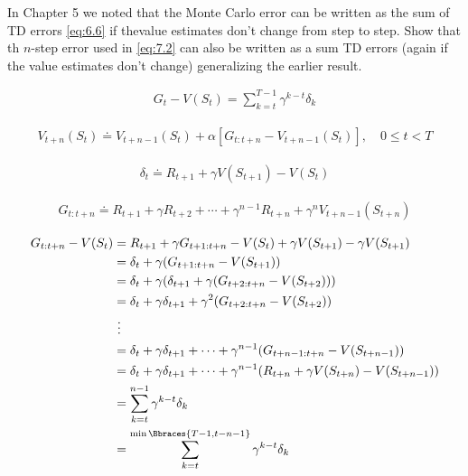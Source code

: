 
\begin{exercise}[Exercise 7.1]

In Chapter 5 we noted that the Monte Carlo error can be written as the sum of TD errors \eqref{eq:6.6} if thevalue estimates don't change from step to step.
Show that th $n$-step error used in \eqref{eq:7.2} can also be written as a sum TD errors (again if the value estimates don't change) generalizing the earlier result.

\begin{align} \label{eq:6.6} \tag{6.6}
    G_t - V(S_t)
    =
    \sum_{k=t}^{T-1}
        \gamma^{k-t}
        \delta_k
\end{align}

\begin{align} \label{eq:7.2} \tag{7.2}
    V_{t+n}(S_t)
    \doteq
    V_{t+n-1}(S_t) + \alpha [G_{t:t+n} - V_{t+n-1}(S_t)],
    \quad
    0 \leq t < T
\end{align}

\end{exercise}


\begin{solution}

\begin{align} \label{eq:6.5} \tag{6.5}
    \delta_t
    \doteq
    R_{t+1} + \gamma V(S_{t+1}) - V(S_t)
\end{align}

\begin{align} \label{eq:7.1} \tag{7.1}
    G_{t:t+n}
    \doteq
    R_{t+1} + \gamma R_{t+2} + \cdots + \gamma^{n-1} R_{t+n} + \gamma^n V_{t+n-1}(S_{t+n})
\end{align}

\begin{align*}
    G_{t:t+n} - V(S_t)
    & =
    R_{t+1} + \gamma G_{t+1:t+n} - V(S_t) + \gamma V(S_{t+1}) - \gamma V(S_{t+1}) \\
    & =
    \delta_t + \gamma (G_{t+1:t+n} - V(S_{t+1})) \\
    & =
    \delta_t + \gamma (\delta_{t+1} + \gamma (G_{t+2:t+n} - V(S_{t+2}))) \\
    & =
    \delta_t + \gamma \delta_{t+1} + \gamma^2 (G_{t+2:t+n} - V(S_{t+2})) \\
    & ~ \vdots \\
    & =
    \delta_t + \gamma \delta_{t+1} + \cdots + \gamma^{n-1} (G_{t+n-1:t+n} - V(S_{t+n-1})) \\
    & =
    \delta_t + \gamma \delta_{t+1} + \cdots + \gamma^{n-1} (R_{t+n} + \gamma V(S_{t+n}) - V(S_{t+n-1})) \\
    & =
    \sum_{k=t}^{n-1}
        \gamma^{k-t} \delta_k \\
    & =
    \sum_{k=t}^{\min \Bbraces{T-1, t-n-1}}
        \gamma^{k-t} \delta_k
\end{align*}

\end{solution}

